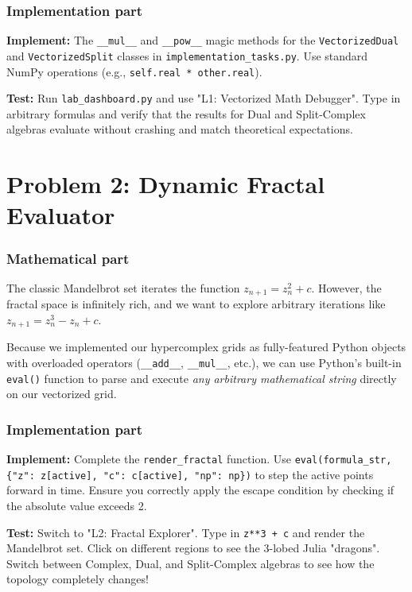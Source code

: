 \documentclass[11pt]{article}
\begin{document}
\subsubsection*{Implementation part}
\textbf{Implement:} The \lstinline|__mul__| and \lstinline|__pow__| magic methods for the \lstinline|VectorizedDual| and \lstinline|VectorizedSplit| classes in \lstinline|implementation_tasks.py|. Use standard NumPy operations (e.g., \lstinline|self.real * other.real|).

\textbf{Test:} Run \lstinline|lab_dashboard.py| and use "L1: Vectorized Math Debugger". Type in arbitrary formulas and verify that the results for Dual and Split-Complex algebras evaluate without crashing and match theoretical expectations.

\section*{Problem 2: Dynamic Fractal Evaluator}

\subsubsection*{Mathematical part}
The classic Mandelbrot set iterates the function $z_{n+1} = z_n^2 + c$. However, the fractal space is infinitely rich, and we want to explore arbitrary iterations like $z_{n+1} = z_n^3 - z_n + c$. 

Because we implemented our hypercomplex grids as fully-featured Python objects with overloaded operators (\lstinline|__add__|, \lstinline|__mul__|, etc.), we can use Python's built-in \lstinline|eval()| function to parse and execute \textit{any arbitrary mathematical string} directly on our vectorized grid.

\subsubsection*{Implementation part}
\textbf{Implement:} Complete the \lstinline|render_fractal| function. Use \lstinline|eval(formula_str, {"z": z[active], "c": c[active], "np": np})| to step the active points forward in time. Ensure you correctly apply the escape condition by checking if the absolute value exceeds 2.

\textbf{Test:} Switch to "L2: Fractal Explorer". Type in \lstinline|z**3 + c| and render the Mandelbrot set. Click on different regions to see the 3-lobed Julia "dragons". Switch between Complex, Dual, and Split-Complex algebras to see how the topology completely changes!
\end{document}
